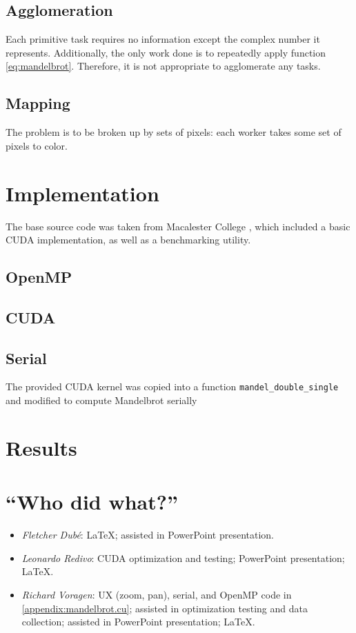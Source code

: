 \documentclass{article}
\begin{document}
\subsection{Agglomeration}
Each primitive task requires no information except the complex number it represents. Additionally, the only work done is to repeatedly apply function \ref{eq:mandelbrot}. Therefore, it is not appropriate to agglomerate any tasks.

\subsection{Mapping}
The problem is to be broken up by sets of pixels: each worker takes some set of pixels to color.


\section{Implementation} \label{sec:impl}
The base source code was taken from Macalester College \cite{mandel_orig}, which included a basic CUDA implementation, as well as a benchmarking utility.

\subsection{OpenMP}

\subsection{CUDA}


\subsection{Serial}
The provided CUDA kernel was copied into a function \verb|mandel_double_single| and modified to compute Mandelbrot serially


\section{Results}
\appendix
\pagebreak
\section{``Who did what?''}
\begin{itemize}
	\item \emph{Fletcher Dub\'e}: \LaTeX{}; assisted in PowerPoint presentation.

	\item \emph{Leonardo Redivo}: CUDA optimization and testing; PowerPoint presentation; \LaTeX{}.

	\item \emph{Richard Voragen}: UX (zoom, pan), serial, and OpenMP code in \ref{appendix:mandelbrot.cu}; assisted in optimization testing and data collection; assisted in PowerPoint presentation; \LaTeX{}.

\end{itemize}
\end{document}
